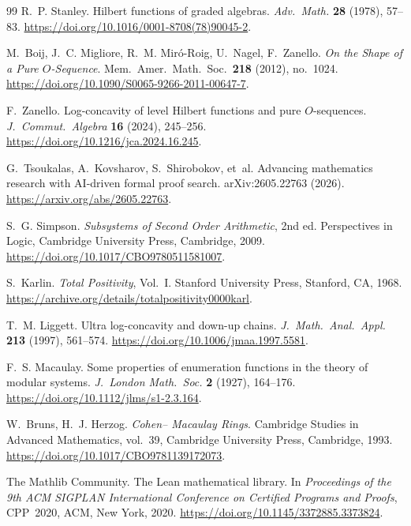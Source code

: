 \documentclass[11pt,reqno]{amsart}
\begin{document}
\begin{thebibliography}{99}
 R.~P. Stanley. \newblock Hilbert functions of graded 
algebras. \newblock \emph{Adv.\ Math.} \textbf{28} (1978), 57--83. 
\newblock
\url{https://doi.org/10.1016/0001-8708(78)90045-2}. \medskip

 M.~Boij, J.~C. Migliore, R.~M. Mir\'o-Roig, U.~Nagel, 
F.~Zanello. \newblock \emph{On the Shape of a Pure $O$-Sequence}. \newblock
Mem.\ Amer.\ Math.\ Soc.\ \textbf{218} (2012), no.~1024. \newblock
\url{https://doi.org/10.1090/S0065-9266-2011-00647-7}. \medskip

 F.~Zanello. \newblock Log-concavity of level Hilbert 
functions and pure $O$-sequences. \newblock \emph{J.\ Commut.\ Algebra}  
\textbf{16} (2024), 245--256. \newblock
\url{https://doi.org/10.1216/jca.2024.16.245}. \medskip

 G.~Tsoukalas, A.~Kovsharov, S.~Shirobokov, et~al.  %
\newblock Advancing mathematics research with AI-driven formal proof search.
\newblock arXiv:2605.22763 (2026). \newblock
\url{https://arxiv.org/abs/2605.22763}. \medskip

 S.~G. Simpson. \newblock \emph{Subsystems of Second
Order Arithmetic}, 2nd ed. \newblock Perspectives in Logic, Cambridge 
University Press, Cambridge, 2009. \newblock
\url{https://doi.org/10.1017/CBO9780511581007}. \medskip

 S.~Karlin. \newblock \emph{Total Positivity}, Vol.~I.  %
\newblock Stanford University Press, Stanford, CA, 1968. \newblock
\url{https://archive.org/details/totalpositivity0000karl}. \medskip

 T.~M. Liggett. \newblock Ultra log-concavity and 
down-up chains. \newblock \emph{J.\ Math.\ Anal.\ Appl.} \textbf{213} 
(1997), 561--574. \newblock
\url{https://doi.org/10.1006/jmaa.1997.5581}. \medskip

 F.~S. Macaulay. \newblock Some properties of 
enumeration functions in the theory of modular systems. \newblock
\emph{J.\ London Math.\ Soc.} \textbf{2} (1927), 164--176. \newblock
\url{https://doi.org/10.1112/jlms/s1-2.3.164}. \medskip

 W.~Bruns, H.~J. Herzog. \newblock \emph{Cohen--
Macaulay Rings}. \newblock Cambridge Studies in Advanced Mathematics, 
vol.~39, Cambridge University Press, Cambridge, 1993. \newblock
\url{https://doi.org/10.1017/CBO9781139172073}. \medskip

 {The Mathlib Community}. \newblock The Lean 
mathematical library. \newblock In \emph{Proceedings of the 9th ACM SIGPLAN
International Conference on Certified Programs and Proofs},  CPP~2020, ACM,
New York, 2020. \newblock
\url{https://doi.org/10.1145/3372885.3373824}.
\end{thebibliography}
\end{document}
